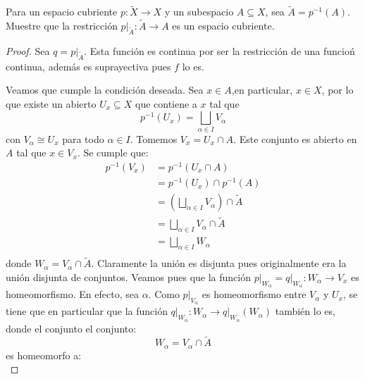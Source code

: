 \documentclass[12pt]{report}
\newcounter{it}
\theoremstyle{largebreak}
\newcommand\cf[3]{\ensuremath{#1:#2\rightarrow#3}}
\begin{document}
    \begin{excer}
        Para un espacio cubriente $\cf{p}{\widetilde{X}}{X}$ y un subespacio $A\subseteq X$, sea $\widetilde{A}=p^{-1}(A)$. Muestre que la restricción $\cf{p|_{\widetilde{A}}}{\widetilde{A}}{A}$ es un espacio cubriente.
    \end{excer}

    \begin{proof}
        Sea $q=p|_{\widetilde{A}}$. Esta función es continua por ser la restricción de una funcioń continua, además es suprayectiva pues $f$ lo es.
        
        Veamos que cumple la condición deseada. Sea $x\in A$,en particular, $x\in X$, por lo que existe un abierto $U_x\subseteq X$ que contiene a $x$ tal que
        \begin{equation*}
            p^{-1}(U_x)=\bigsqcup_{\alpha\in I}V_\alpha
        \end{equation*}
        con $V_\alpha\cong U_x$ para todo $\alpha\in I$. Tomemos $V_x=U_x\cap A$. Este conjunto es abierto en $A$ tal que $x\in V_x$. Se cumple que:
        \begin{equation*}
            \begin{split}
                p^{-1}(V_x)&=p^{-1}(U_x\cap A)\\
                &=p^{-1}(U_x)\cap p^{-1}(A)\\
                &=\left(\bigsqcup_{\alpha\in I}V_\alpha\right)\cap\widetilde{A}\\
                &=\bigsqcup_{\alpha\in I}V_\alpha\cap\widetilde{A}\\
                &=\bigsqcup_{\alpha\in I}W_\alpha\\
            \end{split}
        \end{equation*}
        donde $W_\alpha=V_\alpha\cap\widetilde{A}$. Claramente la unión es disjunta pues originalmente era la unión disjunta de conjuntos. Veamos pues que la función $\cf{p\Big|_{W_\alpha}=q\Big|_{W_\alpha}}{W_\alpha}{V_x}$ es homeomorfismo. En efecto, sea $\alpha$. Como $p\Big|_{V_\alpha}$ es homeomorfismo entre $V_\alpha$ y $U_x$, se tiene que en particular que la función $\cf{q\Big|_{W_\alpha}}{W_\alpha}{q\Big|_{W_\alpha}(W_\alpha)}$ también lo es, donde el conjunto el conjunto:
        \begin{equation*}
            W_\alpha=V_\alpha\cap\widetilde{A}
        \end{equation*}
        es homeomorfo a:
        \begin{equation*}

\end{equation*}
\end{proof}
\end{document}
